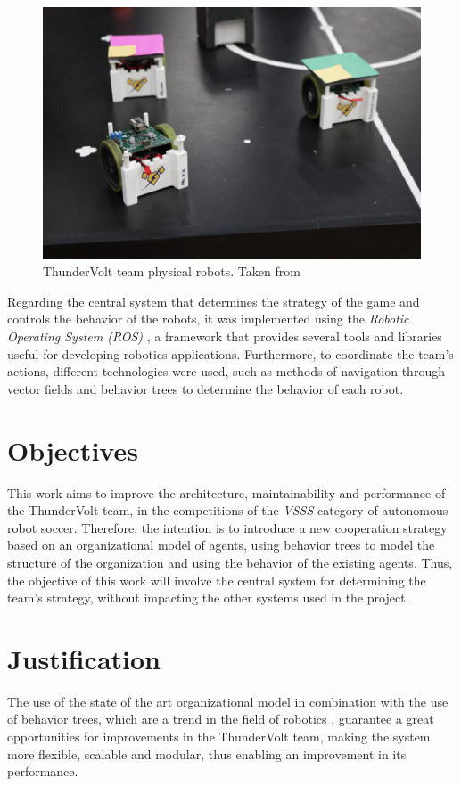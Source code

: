 \begin{figure}[!ht]
    \centering
    \includegraphics[width=.6\linewidth]{images/ThunderVolt Robots.jpeg}
    \caption{ThunderVolt team physical robots. Taken from \cite{ThunderVolt}}
    \label{fig:physical_robots}
\end{figure}

Regarding the central system that determines the strategy of the game and controls the behavior of the robots, it was implemented using the \textit{Robotic Operating System (ROS)} \cite{ROS}, a framework that provides several tools and libraries useful for developing robotics applications. Furthermore, to coordinate the team's actions, different technologies were used, such as methods of navigation through vector fields \cite{VectorFields} and behavior trees \cite{BTsInRobotics} to determine the behavior of each robot.

\section{Objectives}

This work aims to improve the architecture, maintainability and performance of the ThunderVolt team, in the competitions of the \textit{VSSS} category of autonomous robot soccer. Therefore, the intention is to introduce a new cooperation strategy based on an organizational model \cite{Moise} of agents, using behavior trees to model the structure of the organization and using the behavior of the existing agents. Thus, the objective of this work will involve the central system for determining the team's strategy, without impacting the other systems used in the project.

\section{Justification}

The use of the state of the art organizational model \cite{Moise} in combination with the use of behavior trees, which are a trend in the field of robotics \cite{BTsInRobotics}, guarantee a great opportunities for improvements in the ThunderVolt team, making the system more flexible, scalable and modular, thus enabling an improvement in its performance.

